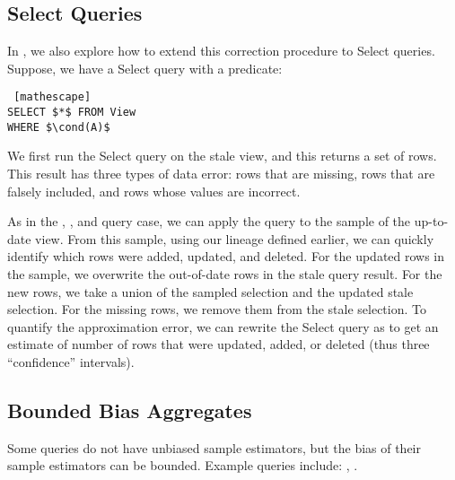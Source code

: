 \iffalse
\begin{proposition} (BOOTSTRAP OVER DIFFERENCES) Let q be an aggregate query that has an unbiased sample estimate, and let $\hat{S}$ and $\hat{S'}$ be sample views as defined before. 
One sample of the bootstrap estimator $s$ is defined as the difference of q applied to random subsample of size $b_1$ (with replacement) of $\hat{S}$ and $\hat{S'}$.
We denote subsamples of the samples as $\hat{S'}_{sub}$ and $\hat{S}_{sub}$ respectively.
\[q(\hat{S'}_{sub}) - q(\hat{S}_{sub})\]
To build the confidence interval, we repeatedly apply this procedure $b_2$ times.
\end{proposition}
\fi


\subsection{Select Queries}
In \svc, we also explore how to extend this correction procedure to Select queries.
Suppose, we have a Select query with a predicate:
\begin{lstlisting} [mathescape]
SELECT $*$ FROM View 
WHERE $\cond(A)$
\end{lstlisting}

We first run the Select query on the stale view, and this returns a set of rows.
This result has three types of data error: rows that are missing, rows that are falsely included, and rows whose values are incorrect.

As in the \sumfunc, \countfunc, and \avgfunc query case, we can apply the query to the sample of the up-to-date view.
From this sample, using our lineage defined earlier, we can quickly identify which rows were added, updated, and deleted.
For the updated rows in the sample, we overwrite the out-of-date rows in the stale query result.
For the new rows, we take a union of the sampled selection and the updated stale selection.
For the missing rows, we remove them from the stale selection.
To quantify the approximation error, we can rewrite the Select query as \countfunc to get an estimate of number of rows that were updated, added, or deleted (thus three ``confidence'' intervals). 


\iffalse
\subsection{Bounded Bias Aggregates}
Some queries do not have unbiased sample estimators, but the bias of their sample estimators can be bounded. Example queries include: \medfunc, \percfunc.

